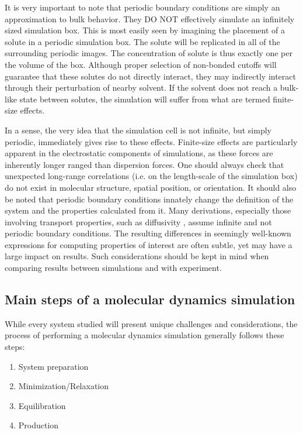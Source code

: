 \documentclass[9pt,bestpractices]{livecoms}
\begin{document}
It is very important to note that periodic boundary conditions are simply an approximation to bulk behavior. 
They DO NOT effectively simulate an infinitely sized simulation box. 
This is most easily seen by imagining the placement of a solute in a periodic simulation box. 
The solute will be replicated in all of the surrounding periodic images. 
The concentration of solute is thus exactly one per the volume of the box. 
Although proper selection of non-bonded cutoffs will guarantee that these solutes do not directly interact, they may indirectly interact through their perturbation of nearby solvent. 
If the solvent does not reach a bulk-like state between solutes, the simulation will suffer from what are termed finite-size effects. 

In a sense, the very idea that the simulation cell is not infinite, but simply periodic, immediately gives rise to these effects. 
Finite-size effects are particularly apparent in the electrostatic components of simulations, as these forces are inherently longer ranged than dispersion forces. 
One should always check that unexpected long-range correlations (i.e. on the length-scale of the simulation box) do not exist in molecular structure, spatial position, or orientation. 
It should also be noted that periodic boundary conditions innately change the definition of the system and the properties calculated from it. 
Many derivations, especially those involving transport properties, such as diffusivity \citep{Yeh2004}, assume infinite and not periodic boundary conditions. %
The resulting differences in seemingly well-known expressions for computing properties of interest are often subtle, yet may have a large impact on results. 
Such considerations should be kept in mind when comparing results between simulations and with experiment.

\subsection{Main steps of a molecular dynamics simulation}
While every system studied will present unique challenges and considerations, the process of performing a molecular dynamics simulation generally follows these steps:

\begin{enumerate}
\item System preparation
\item Minimization/Relaxation
\item Equilibration
\item Production
\end{enumerate}
\end{document}
